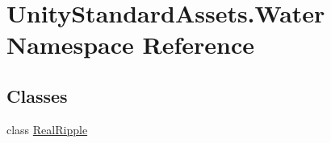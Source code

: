 \hypertarget{namespace_unity_standard_assets_1_1_water}{}\section{Unity\+Standard\+Assets.\+Water Namespace Reference}
\label{namespace_unity_standard_assets_1_1_water}
\subsection*{Classes}
\begin{DoxyCompactItemize}
\item 
class \hyperlink{class_unity_standard_assets_1_1_water_1_1_real_ripple}{Real\+Ripple}
\end{DoxyCompactItemize}
